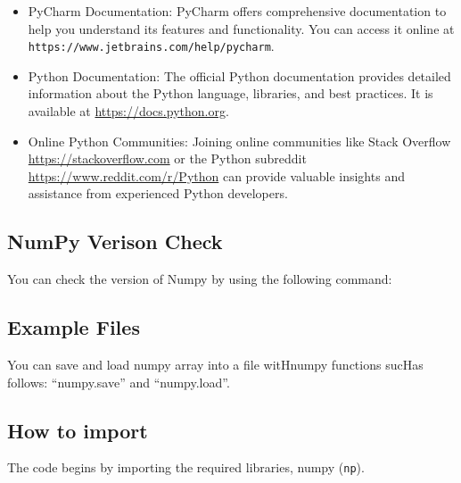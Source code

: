\begin{itemize}
	\item PyCharm Documentation: PyCharm offers comprehensive documentation to
	help you understand its features and functionality. You can access it online
	at \texttt{https://www.jetbrains.com/help/pycharm}.
	
	\item Python Documentation: The official Python documentation provides
	detailed information about the Python language, libraries, and best
	practices. It is available at \url{https://docs.python.org}.
	
	\item Online Python Communities: Joining online communities like Stack
	Overflow \url{https://stackoverflow.com} or the Python subreddit
	\url{https://www.reddit.com/r/Python} can provide valuable insights and
	assistance from experienced Python developers.
\end{itemize}

\subsection{NumPy Verison Check}
You can check the version of Numpy by using the following command:

\begin{code}
	[H] 
	\caption*{../Code/NumPy/NumPy.py}
	\caption{Version Check}
\end{code}

\subsection{Example Files}
You can save and load numpy array into a file witHnumpy functions sucHas follows:
“numpy.save” and “numpy.load”.

\begin{code}
	[H] 
	\caption*{../Code/NumPy/NumPy.py}
	\caption{NumPy-Example Files}
\end{code}

\subsection{How to import}
The code begins by importing the required libraries, numpy (\texttt{np}).

\begin{code}
	[H] 
	\caption*{../Code/NumPy/NumPy.py}
	\caption{How to Import the package}
\end{code}

